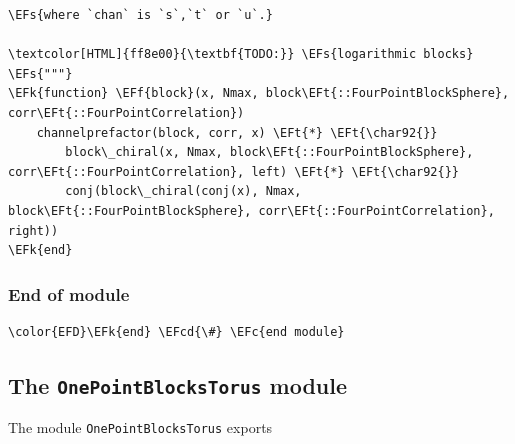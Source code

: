 \documentclass[a4paper]{article}
\numberwithin{equation}{section}
\newcommand{\EFc}[1]{\textcolor{EFc}{#1}} %
\newcommand{\EFcd}[1]{\textcolor{EFcd}{#1}} %
\newcommand{\EFs}[1]{\textcolor{EFs}{#1}} %
\newcommand{\EFk}[1]{\textcolor{EFk}{#1}} %
\newcommand{\EFf}[1]{\textcolor{EFf}{#1}} %
\newcommand{\EFt}[1]{\textcolor{EFt}{#1}} %
\begin{document}
\begin{Code}
\begin{Verbatim}
\EFs{where `chan` is `s`,`t` or `u`.}

\textcolor[HTML]{ff8e00}{\textbf{TODO:}} \EFs{logarithmic blocks}
\EFs{"""}
\EFk{function} \EFf{block}(x, Nmax, block\EFt{::FourPointBlockSphere}, corr\EFt{::FourPointCorrelation})
    channelprefactor(block, corr, x) \EFt{*} \EFt{\char92{}}
        block\_chiral(x, Nmax, block\EFt{::FourPointBlockSphere}, corr\EFt{::FourPointCorrelation}, left) \EFt{*} \EFt{\char92{}}
        conj(block\_chiral(conj(x), Nmax, block\EFt{::FourPointBlockSphere}, corr\EFt{::FourPointCorrelation}, right))
\EFk{end}
\end{Verbatim}
\end{Code}
\subsubsection*{End of module}
\label{sec:orgb0970bd}

\begin{Code}
\begin{Verbatim}
\color{EFD}\EFk{end} \EFcd{\#} \EFc{end module}
\end{Verbatim}
\end{Code}
\subsection{The \texttt{OnePointBlocksTorus} module}
\label{sec:orgc2eb3c6}
The module \texttt{OnePointBlocksTorus} exports
\end{document}

